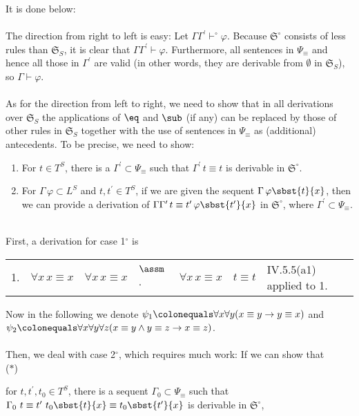 \begin{enumerate}[1.]
\begin{enumerate}[(1)]
It is done below:\\
\ \\
The direction from right to left is easy: Let $\Gamma\Gamma^\prime \vdash^\circ \varphi$. Because $\mathfrak{S}^\circ$ consists of less rules than $\mathfrak{S}_S$, it is clear that $\Gamma\Gamma^\prime \vdash \varphi$. Furthermore, all sentences in $\Psi_\equiv$ and hence all those in $\Gamma^\prime$ are valid (in other words, they are derivable from $\emptyset$ in $\mathfrak{S}_S$), so $\Gamma \vdash \varphi$.\\
\ \\
As for the direction from left to right, we need to show that in all derivations over $\mathfrak{S}_S$ the applications of $\eq$ and $\sub$ (if any) can be replaced by those of other rules in $\mathfrak{S}_S$ together with the use of sentences in $\Psi_\equiv$ as (additional) antecedents. To be precise, we need to show:
\begin{enumerate}[1$^\circ$]
\item For $t \in T^S$, there is a $\Gamma^\prime \subset \Psi_\equiv$ such that $\Gamma^\prime \, t \equiv t$ is derivable in $\mathfrak{S}^\circ$.
\item For $\Gamma \, \varphi \subset L^S$ and $t, t^\prime \in T^S$, if we are given the sequent $\Gamma \, \varphi\sbst{t}{x}$, then we can provide a derivation of $\Gamma\Gamma^\prime \, t \equiv t^\prime \, \varphi\sbst{t^\prime}{x}$ in $\mathfrak{S}^\circ$, where $\Gamma^\prime \subset \Psi_\equiv$.
\end{enumerate}
\ \\
First, a derivation for case 1$^\circ$ is
\begin{center}
\begin{tabular}{llll}
1. & $\forall x \, x \equiv x$ & $\forall x \, x \equiv x$ & $\assm$ . & $\forall x \, x \equiv x$ & $t \equiv t$ & IV.5.5(a1) applied to 1.
\end{tabular}
\end{center}
Now in the following we denote $\psi_1 \colonequals \forall x \forall y (x \equiv y \rightarrow y \equiv x)$ and $\psi_2 \colonequals \forall x \forall y \forall z (x \equiv y \land y \equiv z \rightarrow x \equiv z)$.\\
\ \\
Then, we deal with case 2$^\circ$, which requires much work: If we can show that\\
($\ast$) \hfill \begin{minipage}{10cm}for $t, t^\prime, t_0 \in T^S$, there is a sequent $\Gamma_0 \subset \Psi_\equiv$ such that\\$\Gamma_0 \ t \equiv t^\prime \ t_0\sbst{t}{x} \equiv t_0\sbst{t^\prime}{x}$ is derivable in $\mathfrak{S}^\circ$,\end{minipage}

\end{enumerate}
\end{enumerate}
